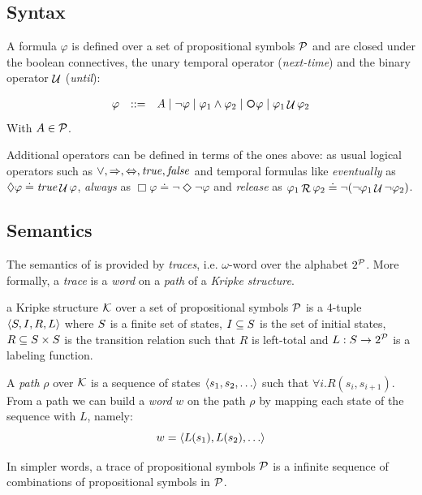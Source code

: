 \subsection{Syntax}
A \LTL formula $\varphi$ is defined over a set of propositional symbols $\mathcal{P}$ and are closed under the boolean connectives, the unary temporal operator \Next (\emph{next-time}) and the binary operator $\mathop{\mathcal{U}}$ (\emph{until}):

\[\begin{array}{rcl}
\varphi &::=& A \mid \lnot \varphi \mid \varphi_1\land \varphi_2 \mid \Next\varphi \mid \varphi_1 \Until \varphi_2
\end{array}
\]
With $A\in \mathcal{P}$.

Additional operators can be defined in terms of the ones above: as usual logical operators such as $\vee, \Rightarrow, \Leftrightarrow, \mathit{true}, \mathit{false}$ and temporal formulas like \emph{eventually} as $\Diamond \varphi \doteq \mathit{true} \mathop{\mathcal{U}} \varphi$, \emph{always} as $\Box \varphi \doteq \lnot \Diamond \lnot \varphi$ and \emph{release} as $\varphi_1 \mathop{\mathcal{R}} \varphi_2 \doteq \lnot (\lnot \varphi_1 \mathop{\mathcal{U}} \lnot \varphi_2)$.

\subsection{Semantics}
The semantics of \LTL is provided by \textit{traces}, i.e. $\omega$-word over the alphabet $2^{\mathcal{P}}$. More formally, a \emph{trace} is a \emph{word} on a \emph{path} of a \emph{Kripke structure}.
\begin{definition}\label{kripke}
	a Kripke structure $\mathcal{K}$ over a set of propositional symbols $\mathcal{P}$ is a 4-tuple $\langle S, I, R, L \rangle$ where $S$ is a finite set of states, $I\subseteq S$ is the set of initial states, $R \subseteq S \times S$ is the transition relation such that $R$ is left-total and $L: S \to 2^{\mathcal{P}}$ is a labeling function.
\end{definition}
A \emph{path} $\rho$ over $\mathcal{K}$ is a sequence of states $\tup{s_1, s_2, \dots}$ such that $\forall i. R(s_i, s_{i+1})$. From a path we can build a \emph{word} $w$ on the path $\rho$ by  
mapping each state of the sequence with $L$, namely:
\[
w = \tup{L(s_1), L(s_2), \dots}
\]

In simpler words, a trace of propositional symbols $\mathcal{P}$ is a infinite sequence of combinations of propositional symbols in $\mathcal{P}$.

